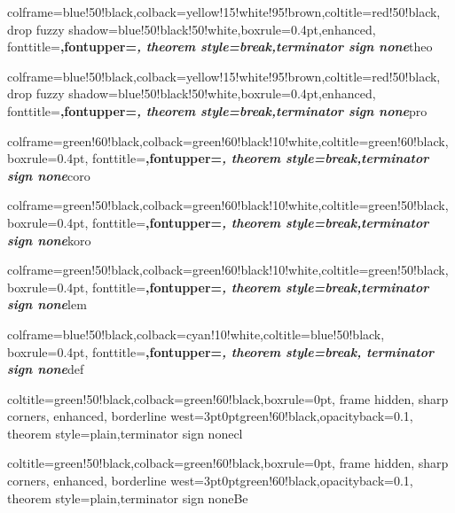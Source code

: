 \usepackage{tcolorbox}

%  
{colframe=blue!50!black,colback=yellow!15!white!95!brown,coltitle=red!50!black,
drop fuzzy shadow=blue!50!black!50!white,boxrule=0.4pt,enhanced,
fonttitle=\upshape\bfseries,fontupper=\itshape,
theorem style=break,terminator sign none}{theo}

%
{colframe=blue!50!black,colback=yellow!15!white!95!brown,coltitle=red!50!black,
drop fuzzy shadow=blue!50!black!50!white,boxrule=0.4pt,enhanced,
fonttitle=\upshape\bfseries,fontupper=\itshape,
theorem style=break,terminator sign none}{pro}

%
{colframe=green!60!black,colback=green!60!black!10!white,coltitle=green!60!black,
boxrule=0.4pt,
fonttitle=\upshape\bfseries,fontupper=\itshape,
theorem style=break,terminator sign none}{coro}

%
{colframe=green!50!black,colback=green!60!black!10!white,coltitle=green!50!black,
boxrule=0.4pt,
fonttitle=\upshape\bfseries,fontupper=\itshape,
theorem style=break,terminator sign none}{koro}

%
{colframe=green!50!black,colback=green!60!black!10!white,coltitle=green!50!black,
boxrule=0.4pt,
fonttitle=\upshape\bfseries,fontupper=\itshape,
theorem style=break,terminator sign none}{lem}

%
{colframe=blue!50!black,colback=cyan!10!white,coltitle=blue!50!black,
boxrule=0.4pt,
fonttitle=\upshape\bfseries,fontupper=\itshape,
theorem style=break, terminator sign none}{def}

%
{coltitle=green!50!black,colback=green!60!black,boxrule=0pt,
frame hidden, sharp corners, enhanced,
borderline west={3pt}{0pt}{green!60!black},opacityback=0.1,
theorem style=plain,terminator sign none}{cl}

%
{coltitle=green!50!black,colback=green!60!black,boxrule=0pt,
frame hidden, sharp corners, enhanced,
borderline west={3pt}{0pt}{green!60!black},opacityback=0.1,
theorem style=plain,terminator sign none}{Be}

